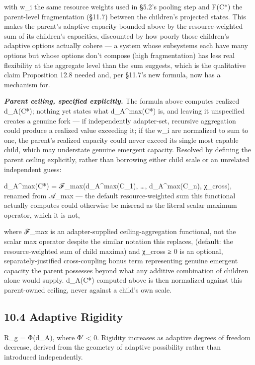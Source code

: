 \documentclass[
]{article}
\begin{document}
with w\_i the same resource weights used in §5.2's pooling step and
F(C*) the parent-level fragmentation (§11.7) between the children's
projected states. This makes the parent's adaptive capacity bounded
above by the resource-weighted sum of its children's capacities,
discounted by how poorly those children's adaptive options actually
cohere --- a system whose subsystems each have many options but whose
options don't compose (high fragmentation) has less real flexibility at
the aggregate level than the sum suggests, which is the qualitative
claim Proposition 12.8 needed and, per §11.7's new formula, now has a
mechanism for.

\emph{\textbf{Parent ceiling, specified explicitly.}} The formula above
computes realized d\_A(C*); nothing yet states what d\_A\^{}max(C*) is,
and leaving it unspecified creates a genuine fork --- if independently
adapter-set, recursive aggregation could produce a realized value
exceeding it; if the w\_i are normalized to sum to one, the parent's
realized capacity could never exceed its single most capable child,
which may understate genuine emergent capacity. Resolved by defining the
parent ceiling explicitly, rather than borrowing either child scale or
an unrelated independent guess:

d\_A\^{}max(C*) = ℱ\_max(d\_A\^{}max(C\_1), \ldots, d\_A\^{}max(C\_n),
χ\_cross), renamed from 𝒜\_max --- the default resource-weighted sum
this functional actually computes could otherwise be misread as the
literal scalar maximum operator, which it is not,

where ℱ\_max is an adapter-supplied ceiling-aggregation functional, not
the scalar max operator despite the similar notation this replaces,
(default: the resource-weighted sum of child maxima) and χ\_cross ≥ 0 is
an optional, separately-justified cross-coupling bonus term representing
genuine emergent capacity the parent possesses beyond what any additive
combination of children alone would supply. d\_A(C*) computed above is
then normalized against this parent-owned ceiling, never against a
child's own scale.

\hypertarget{adaptive-rigidity}{%
\subsection{10.4 Adaptive Rigidity}\label{adaptive-rigidity}}

R\_g = Φ(d\_A), where Φ′ \textless{} 0. Rigidity increases as adaptive
degrees of freedom decrease, derived from the geometry of adaptive
possibility rather than introduced independently.
\end{document}
